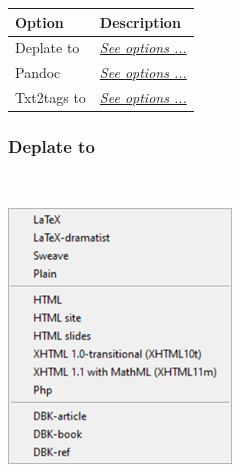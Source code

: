 \begin{scriptsize}
  \begin{tabularx}{\textwidth}{>{\hsize=0.3\hsize}X>{\hsize=0.7\hsize}X}\\
    \hline
    \textbf{Option} & \textbf{Description} \\
    \hline
    Deplate to & \textit{\href{\#menu\_tools\_processing\_conversion\_deplate}{See options ...}} \\
    Pandoc & \textit{\href{\#menu\_tools\_processing\_conversion\_pandoc}{See options ...}} \\
    Txt2tags to & \textit{\href{\#menu\_tools\_processing\_conversion\_txt2tags}{See options ...}} \\
    \hline
  \end{tabularx}
\end{scriptsize}

\hypertarget{menu_tools_processing_conversion_deplate}{}
\subsubsection{Deplate to}\\

\includegraphics[scale=0.50]{./res/menu_tools_processing_conversion_deplate.png}\\

